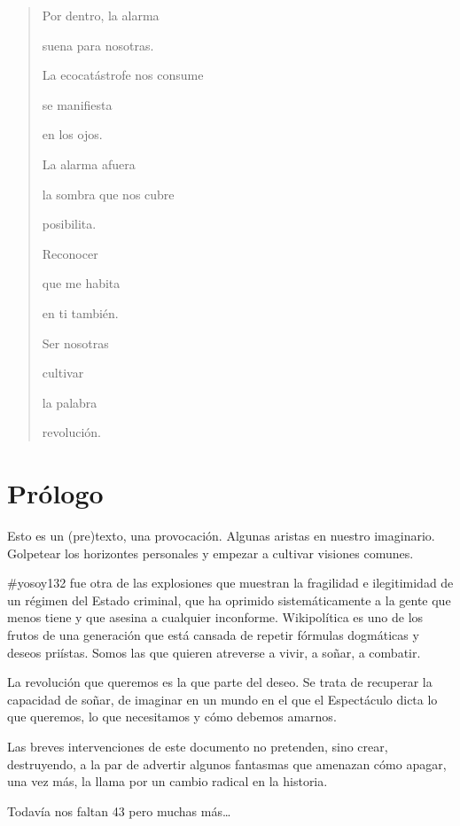 \begin{verse}
    Por dentro, la alarma
    
    suena para nosotras.
    
    La ecocatástrofe nos consume
    
    se manifiesta
    
    en los ojos.
    
    La alarma afuera
    
    la sombra que nos cubre
    
    posibilita.
    
    Reconocer
    
    que me habita
    
    en ti también.
    
    Ser nosotras

        \hspace*{1cm}cultivar
        
        \hspace*{1cm}la palabra
        
        \hspace*{1cm}revolución.
        
\end{verse}

\hypertarget{pruxf3logo}{%
\section{Prólogo}\label{pruxf3logo}}

Esto es un (pre)texto, una provocación. Algunas aristas en nuestro
imaginario. Golpetear los horizontes personales y empezar a cultivar
visiones comunes.

\#yosoy132 fue otra de las explosiones que muestran la fragilidad e
ilegitimidad de un régimen del Estado criminal, que ha oprimido
sistemáticamente a la gente que menos tiene y que asesina a cualquier
inconforme. Wikipolítica es uno de los frutos de una generación que está
cansada de repetir fórmulas dogmáticas y deseos priístas. Somos las que
quieren atreverse a vivir, a soñar, a combatir.

La revolución que queremos es la que parte del deseo. Se trata de
recuperar la capacidad de soñar, de imaginar en un mundo en el que el
Espectáculo dicta lo que queremos, lo que necesitamos y cómo debemos
amarnos.

Las breves intervenciones de este documento no pretenden, sino crear,
destruyendo, a la par de advertir algunos fantasmas que amenazan cómo
apagar, una vez más, la llama por un cambio radical en la historia.

Todavía nos faltan 43 pero muchas más\ldots{}
